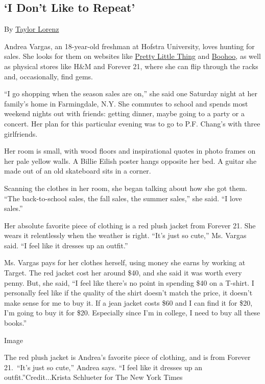 \hypertarget{i-dont-like-to-repeat}{%
\subsection{`I Don't Like to Repeat'}\label{i-dont-like-to-repeat}}

By \href{https://www.nytimes3xbfgragh.onion/by/taylor-lorenz}{Taylor
Lorenz}

Andrea Vargas, an 18-year-old freshman at Hofstra University, loves
hunting for sales. She looks for them on websites like
\href{https://www.prettylittlething.us/}{Pretty Little Thing} and
\href{https://us.boohoo.com/}{Boohoo}, as well as physical stores like
H\&M and Forever 21, where she can flip through the racks and,
occasionally, find gems.

``I go shopping when the season sales are on,'' she said one Saturday
night at her family's home in Farmingdale, N.Y. She commutes to school
and spends most weekend nights out with friends: getting dinner, maybe
going to a party or a concert. Her plan for this particular evening was
to go to P.F. Chang's with three girlfriends.

Her room is small, with wood floors and inspirational quotes in photo
frames on her pale yellow walls. A Billie Eilish poster hangs opposite
her bed. A guitar she made out of an old skateboard sits in a corner.

Scanning the clothes in her room, she began talking about how she got
them. ``The back-to-school sales, the fall sales, the summer sales,''
she said. ``I love sales.''

Her absolute favorite piece of clothing is a red plush jacket from
Forever 21. She wears it relentlessly when the weather is right. ``It's
just so cute,'' Ms. Vargas said. ``I feel like it dresses up an
outfit.''

Ms. Vargas pays for her clothes herself, using money she earns by
working at Target. The red jacket cost her around \$40, and she said it
was worth every penny. But, she said, ``I feel like there's no point in
spending \$40 on a T-shirt. I personally feel like if the quality of the
shirt doesn't match the price, it doesn't make sense for me to buy it.
If a jean jacket costs \$60 and I can find it for \$20, I'm going to buy
it for \$20. Especially since I'm in college, I need to buy all these
books.''

Image

The red plush jacket is Andrea's favorite piece of clothing, and is from
Forever 21.~``It's just so cute,'' Andrea says. ``I feel like it dresses
up an outfit.''Credit...Krista Schlueter for The New York Times


